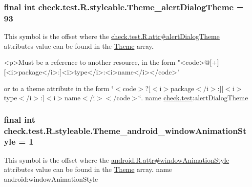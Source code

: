 \subsubsection[{Theme\+\_\+alert\+Dialog\+Theme}]{\setlength{\rightskip}{0pt plus 5cm}final int check.\+test.\+R.\+styleable.\+Theme\+\_\+alert\+Dialog\+Theme = 93\hspace{0.3cm}{\ttfamily [static]}}\label{classcheck_1_1test_1_1_r_1_1styleable_ac9de00117911739b0431126a81b708d4}
This symbol is the offset where the \hyperlink{classcheck_1_1test_1_1_r_1_1attr_a84ef9b5b92050e30d524366c5ea5bee4}{check.\+test.\+R.\+attr\#alert\+Dialog\+Theme} attribute\textquotesingle{}s value can be found in the \hyperlink{classcheck_1_1test_1_1_r_1_1styleable_acca726d02016a0cf607782ec3a436a81}{Theme} array.

\begin{DoxyVerb}      <p>Must be a reference to another resource, in the form "<code>@[+][<i>package</i>:]<i>type</i>:<i>name</i></code>"
\end{DoxyVerb}
 or to a theme attribute in the form \char`\"{}$<$code$>$?\mbox{[}$<$i$>$package$<$/i$>$\+:\mbox{]}\mbox{[}$<$i$>$type$<$/i$>$\+:\mbox{]}$<$i$>$name$<$/i$>$$<$/code$>$\char`\"{}.  name \hyperlink{namespacecheck_1_1test}{check.\+test}\+:alert\+Dialog\+Theme \hypertarget{classcheck_1_1test_1_1_r_1_1styleable_af787bd8d14167f831eaf83cd8fc2098e}{}
\subsubsection[{Theme\+\_\+android\+\_\+window\+Animation\+Style}]{\setlength{\rightskip}{0pt plus 5cm}final int check.\+test.\+R.\+styleable.\+Theme\+\_\+android\+\_\+window\+Animation\+Style = 1\hspace{0.3cm}{\ttfamily [static]}}\label{classcheck_1_1test_1_1_r_1_1styleable_af787bd8d14167f831eaf83cd8fc2098e}
This symbol is the offset where the \hyperlink{}{android.\+R.\+attr\#window\+Animation\+Style} attribute\textquotesingle{}s value can be found in the \hyperlink{classcheck_1_1test_1_1_r_1_1styleable_acca726d02016a0cf607782ec3a436a81}{Theme} array.  name android\+:window\+Animation\+Style \hypertarget{classcheck_1_1test_1_1_r_1_1styleable_a08050f289331059420ffd439bcbc10e8}{}
